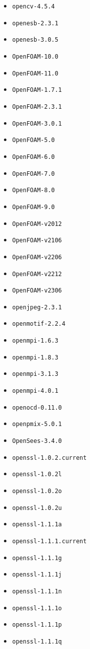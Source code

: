 \begin{multicols}{3}
\begin{itemize}
\item \verb|opencv-4.5.4|
\item \verb|openesb-2.3.1|
\item \verb|openesb-3.0.5|
\item \verb|OpenFOAM-10.0|
\item \verb|OpenFOAM-11.0|
\item \verb|OpenFOAM-1.7.1|
\item \verb|OpenFOAM-2.3.1|
\item \verb|OpenFOAM-3.0.1|
\item \verb|OpenFOAM-5.0|
\item \verb|OpenFOAM-6.0|
\item \verb|OpenFOAM-7.0|
\item \verb|OpenFOAM-8.0|
\item \verb|OpenFOAM-9.0|
\item \verb|OpenFOAM-v2012|
\item \verb|OpenFOAM-v2106|
\item \verb|OpenFOAM-v2206|
\item \verb|OpenFOAM-v2212|
\item \verb|OpenFOAM-v2306|
\item \verb|openjpeg-2.3.1|
\item \verb|openmotif-2.2.4|
\item \verb|openmpi-1.6.3|
\item \verb|openmpi-1.8.3|
\item \verb|openmpi-3.1.3|
\item \verb|openmpi-4.0.1|
\item \verb|openocd-0.11.0|
\item \verb|openpmix-5.0.1|
\item \verb|OpenSees-3.4.0|
\item \verb|openssl-1.0.2.current|
\item \verb|openssl-1.0.2l|
\item \verb|openssl-1.0.2o|
\item \verb|openssl-1.0.2u|
\item \verb|openssl-1.1.1a|
\item \verb|openssl-1.1.1.current|
\item \verb|openssl-1.1.1g|
\item \verb|openssl-1.1.1j|
\item \verb|openssl-1.1.1n|
\item \verb|openssl-1.1.1o|
\item \verb|openssl-1.1.1p|
\item \verb|openssl-1.1.1q|

\end{itemize}
\end{multicols}
